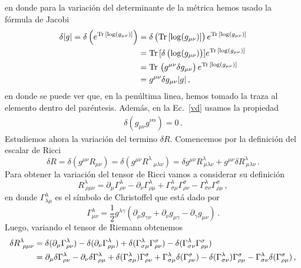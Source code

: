 \documentclass[../Main.tex]{subfiles}
\begin{document}
en donde para la variación del determinante de la métrica hemos usado la fórmula de Jacobi
\begin{align*}
    \delta \lvert g \rvert=\delta\left(e^{\operatorname{Tr\,}[\log(g_{\mu\nu})]}\right)&=\delta\left(\operatorname{Tr\,}[\log(g_{\mu\nu})]\right)e^{\operatorname{Tr\,}[\log(g_{\mu\nu})]}\\
    &=\operatorname{Tr\,}[\delta\left(\log(g_{\mu\nu})\right)]e^{\operatorname{Tr\,}[\log(g_{\mu\nu})]}\\
    &=\operatorname{Tr\,}\left(g^{\mu\nu}\delta g_{\mu\nu}\right)e^{\operatorname{Tr\,}[\log(g_{\mu\nu})]}\\
    &=g^{\mu\nu}\delta g_{\mu\nu}\lvert g \rvert \, ,
\end{align*}
en donde se puede ver que, en la penúltima linea, hemos tomado la traza al elemento dentro del paréntesis. Además, en la Ec.~\eqref{vd} usamos la propiedad 
\begin{align}
    \delta(g_{\mu\nu}g^{\nu\alpha})=0\, .
\end{align}
Estudiemos ahora la variación del termino $\delta R$. Comencemos por la definición del escalar de Ricci
\begin{equation} \label{varr}
    \delta R= \delta (g^{\mu\nu}R_{\mu\nu})=\delta (g^{\mu\nu}R^{\lambda}\,_{\mu\lambda\nu})=\delta g^{\mu\nu}R^{\lambda}_{\ \mu\lambda\nu}+g^{\mu\nu}\delta R^{\lambda}_{\ \mu\lambda\nu} \, .
\end{equation}
Para obtener la variación del tensor de Ricci vamos a considerar su definición 
\begin{equation}
R^{\lambda}_{\ \rho\mu\nu}=\partial_{\mu}\Gamma^{\lambda}_{\rho\nu}-\partial_{\nu}\Gamma^{\lambda}_{\rho\mu}+\Gamma^{\lambda}_{\sigma\mu}\Gamma^{\sigma}_{\rho\nu}-\Gamma^{\lambda}_{\sigma\nu}\Gamma^{\sigma}_{\rho\mu}\, ,
\end{equation}
en donde $\Gamma^{\lambda}_{\lambda\mu}$ es el símbolo de Christoffel que está dado por
\begin{equation} \label{chr}
    \Gamma^{\lambda}_{\mu\nu}=\frac{1}{2}g^{\lambda\gamma}\left(\partial_{\mu}g_{\gamma\nu}+\partial_{\nu}g_{\mu\gamma}-\partial_{\gamma}g_{\mu\nu}\right)\,.
\end{equation}
Luego, variando el tensor de Riemann obtenemos
\begin{align} \notag
\delta R^{\lambda}_{\ \rho\mu\nu}&=\delta(\partial_{\mu}\Gamma^{\lambda}_{\rho\nu})-\delta(\partial_{\nu}\Gamma^{\lambda}_{\rho\mu})+\delta(\Gamma^{\lambda}_{\sigma\mu}\Gamma^{\sigma}_{\rho\nu})-\delta(\Gamma^{\lambda}_{\sigma\nu}\Gamma^{\sigma}_{\rho\mu})\\
&=\partial_{\mu}\delta\Gamma^{\lambda}_{\rho\nu}-\partial_{\nu}\delta\Gamma^{\lambda}_{\rho\mu}+\delta(\Gamma^{\lambda}_{\sigma\mu})\Gamma^{\sigma}_{\rho\nu}+\Gamma^{\lambda}_{\sigma\mu}\delta(\Gamma^{\sigma}_{\rho\nu})-\delta(\Gamma^{\lambda}_{\sigma\nu})\Gamma^{\sigma}_{\rho\mu}-\Gamma^{\lambda}_{\sigma\nu}\delta(\Gamma^{\sigma}_{\rho\mu})\, ,
\end{align}
\end{document}
